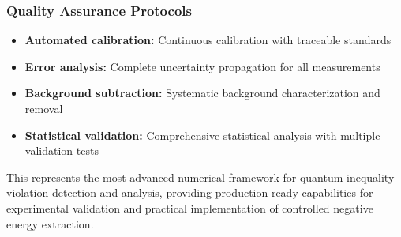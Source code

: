 \documentclass[11pt]{article}
\begin{document}
\subsubsection{Quality Assurance Protocols}
\begin{itemize}
\item \textbf{Automated calibration:} Continuous calibration with traceable standards
\item \textbf{Error analysis:} Complete uncertainty propagation for all measurements
\item \textbf{Background subtraction:} Systematic background characterization and removal
\item \textbf{Statistical validation:} Comprehensive statistical analysis with multiple validation tests
\end{itemize}

This represents the most advanced numerical framework for quantum inequality violation detection and analysis, providing production-ready capabilities for experimental validation and practical implementation of controlled negative energy extraction.
\end{document}
